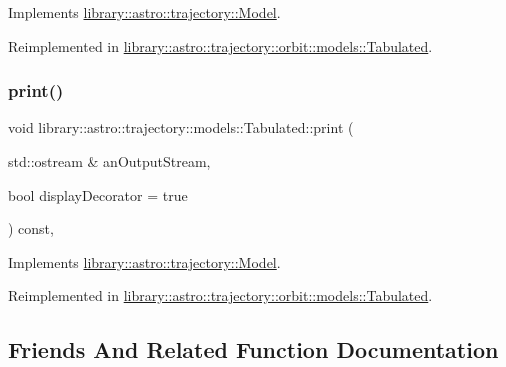 Implements \hyperlink{classlibrary_1_1astro_1_1trajectory_1_1_model_a83c52eb23e8feea58d600c87700ed923}{library\+::astro\+::trajectory\+::\+Model}.



Reimplemented in \hyperlink{classlibrary_1_1astro_1_1trajectory_1_1orbit_1_1models_1_1_tabulated_a7194a96e062cb6a8c109c82e169a9d7d}{library\+::astro\+::trajectory\+::orbit\+::models\+::\+Tabulated}.

\mbox{\label{classlibrary_1_1astro_1_1trajectory_1_1models_1_1_tabulated_a3eae12849178fe43d30a620edceddd8e}} 
\subsubsection{\texorpdfstring{print()}{print()}}
{\footnotesize\ttfamily void library\+::astro\+::trajectory\+::models\+::\+Tabulated\+::print (\begin{DoxyParamCaption}\item[{std\+::ostream \&}]{an\+Output\+Stream,  }\item[{bool}]{display\+Decorator = {\ttfamily true} }\end{DoxyParamCaption}) const\hspace{0.3cm}{\ttfamily [override]}, {\ttfamily [virtual]}}



Implements \hyperlink{classlibrary_1_1astro_1_1trajectory_1_1_model_af3dd0c38fdbac0b64f689fd8c88c3320}{library\+::astro\+::trajectory\+::\+Model}.



Reimplemented in \hyperlink{classlibrary_1_1astro_1_1trajectory_1_1orbit_1_1models_1_1_tabulated_a545a7209580a0c3863f37e2bdd925cb6}{library\+::astro\+::trajectory\+::orbit\+::models\+::\+Tabulated}.



\subsection{Friends And Related Function Documentation}
\mbox{\label{classlibrary_1_1astro_1_1trajectory_1_1models_1_1_tabulated_af2b779226be02822defbe40cf6d3c4b8}} 
